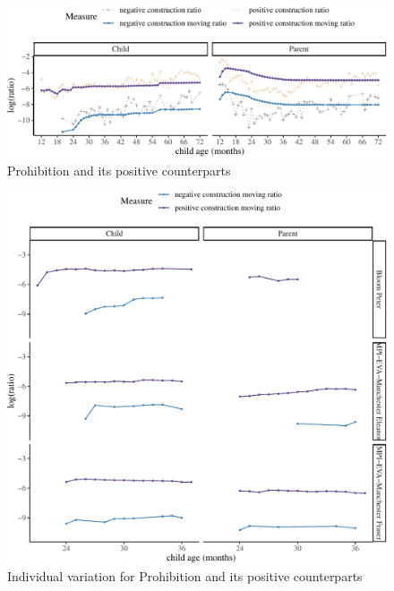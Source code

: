 \documentclass[
  english,
  man,floatsintext]{apa6}
\begin{document}
\begin{figure}[H]

{\centering \includegraphics{neg_construction_article_files/figure-latex/prohibition-1} 

}

\caption{Prohibition and its positive counterparts}\label{fig:prohibition}
\end{figure}

\begin{figure}[H]

{\centering \includegraphics{neg_construction_article_files/figure-latex/individualprohibition-1} 

}

\caption{Individual variation for Prohibition and its positive counterparts}\label{fig:individualprohibition}
\end{figure}
\end{document}
